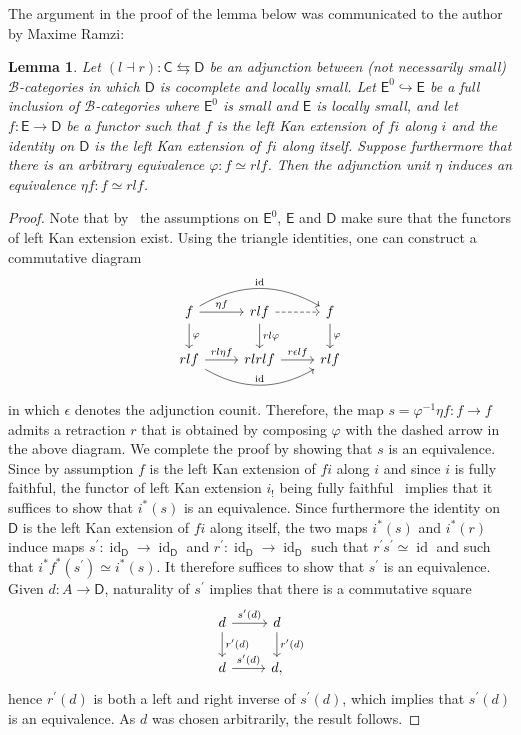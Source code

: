 \documentclass[reqno]{amsart}
\numberwithin{equation}{subsection}
\theoremstyle{plain}
\newtheorem{lemma}[equation]{Lemma}
\theoremstyle{definition}
\let\scr=\mathcal
\let\phi=\varphi
\let\into=\hookrightarrow
\def\BB{\scr B}
\DeclareMathOperator{\id}{id}
\newcommand{\I}[1]{\mathsf{#1}}
\begin{document}
The argument in the proof of the lemma below was communicated to the author by Maxime Ramzi:
\begin{lemma}
	\label{lem:AdjunctionUnitEquivalenceCriterion}
	Let $(l\dashv r)\colon \I{C}\leftrightarrows\I{D}$ be an adjunction between (not necessarily small) $\BB$-categories in which $\I{D}$ is cocomplete and locally small. Let $\I{E}^0\into\I{E}$ be a full inclusion of $\BB$-categories where $\I{E}^0$ is small and $\I{E}$ is locally small, and let $f\colon \I{E}\to\I{D}$ be a functor such that $f$ is the left Kan extension of $fi$ along $i$ and the identity on $\I{D}$ is the left Kan extension of $fi$ along itself. Suppose furthermore that there is an arbitrary equivalence $\phi\colon f\simeq rlf$. Then the adjunction unit $\eta$ induces an equivalence $\eta f\colon f\simeq rl f$.
\end{lemma}
\begin{proof}
	Note that by~\cite[Corollary~6.3.7]{Martini2021a} the assumptions on $\I{E}^0$, $\I{E}$ and $\I{D}$ make sure that the functors of left Kan extension exist.
	Using the triangle identities, one can construct a commutative diagram
	\begin{equation*}
	\begin{tikzcd}
	f\arrow[r, "\eta f"]\arrow[d, "\phi"] \arrow[rr, bend left,  "\id"]& rlf\arrow[r, dashed] \arrow[d, "rl\phi"]& f\arrow[d, "\phi"]\\
	rlf\arrow[r, "rl\eta f"] \arrow[rr, bend right, "\id"]& rlrlf\arrow[r, "r\epsilon lf"] & rlf
	\end{tikzcd}
	\end{equation*}
	in which $\epsilon$ denotes the adjunction counit. Therefore, the map $s=\phi^{-1}\eta f\colon f\to f$ admits a retraction $r$ that is obtained by composing $\phi$ with the dashed arrow in the above diagram. We complete the proof by showing that $s$ is an equivalence. Since by assumption $f$ is the left Kan extension of $fi$ along $i$ and since $i$ is fully faithful, the functor of left Kan extension $i_!$ being fully faithful~\cite[Theorem~6.3.6]{Martini2021a} implies that it suffices to show that $i^\ast(s)$ is an equivalence. Since furthermore the identity on $\I{D}$ is the left Kan extension of $fi$ along itself, the two maps $i^\ast(s)$ and $i^\ast(r)$ induce maps $s^\prime\colon \id_{\I{D}}\to\id_{\I{D}}$ and $r^\prime\colon \id_{\I{D}}\to\id_{\I{D}}$ such that $r^\prime s^\prime\simeq\id$ and such that $i^\ast f^\ast(s^\prime)\simeq i^\ast(s)$. It therefore suffices to show that $s^\prime$ is an equivalence. Given $d\colon A\to \I{D}$, naturality of $s^\prime$ implies that there is a commutative square
	\begin{equation*}
	\begin{tikzcd}
	d\arrow[r, "s^\prime(d)"]\arrow[d, "r^\prime(d)"] & d\arrow[d, "r^\prime(d)"]\\
	d\arrow[r, "s^\prime(d)"] & d,
	\end{tikzcd}
	\end{equation*}
	hence $r^\prime(d)$ is both a left and right inverse of $s^\prime(d)$, which implies that $s^\prime(d)$ is an equivalence. As $d$ was chosen arbitrarily, the result follows.
\end{proof}
\end{document}
